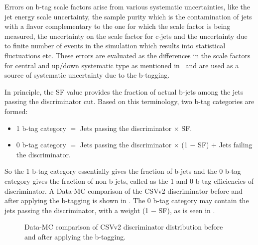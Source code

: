 Errors on b-tag scale factors arise from various systematic uncertainties, like the jet energy scale uncertainty, the sample purity which is
the contamination of jets with a flavor complementary to the one for which the scale factor is being measured, the uncertainty on the scale factor for
c-jets and the uncertainty due to finite number of events in the simulation which results into statistical fluctuations etc.
These errors are evaluated as the differences in the scale factors for central and up$/$down systematic type as mentioned in~\cite{Web:BtagReco}
and are used as a source of systematic uncertainty due to the b-tagging.

In principle, the SF value provides the fraction of actual b-jets among the jets passing the discriminator cut. Based on this terminology, two b-tag categories are
formed:
\vspace{-0.1in}
\begin{itemize}[leftmargin=*]
\item 1 b-tag category $=$ Jets passing the discriminator $\times$ SF.
\item 0 b-tag category $=$ Jets passing the discriminator $\times$ (1 $-$ SF) $+$ Jets failing the discriminator.
\end{itemize}
\vspace{-0.1in}
So the 1 b-tag category essentially gives the fraction of b-jets and the 0 b-tag category gives the fraction of non b-jets, called as the 1 and 0 b-tag
efficiencies of discriminator. A Data-MC comparison of the CSVv2 discriminator before and after applying the b-tagging is shown in \fig{\ref{fig:CSVv2_dist}}.
The 0 b-tag category may contain the jets passing the discriminator, with a weight (1 $-$ SF), as is seen in \fig{\ref{fig:CSVv2_0}}.

\begin{figure}[h!]
\centering
{}
\caption{Data-MC comparison of CSVv2 discriminator distribution before and after applying the b-tagging.}
\label{fig:CSVv2_dist}
\end{figure}

